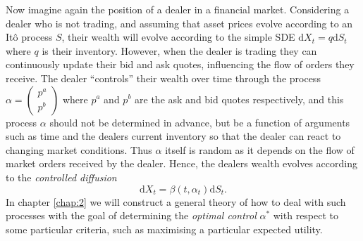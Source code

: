 Now imagine again the position of a dealer in a financial market. Considering a dealer
who is not trading, and assuming that asset prices evolve
according to an It\^{o} process $S$, their wealth will evolve according to the simple 
SDE $\mathrm dX_t=q\mathrm dS_t$ where $q$ is their inventory. However, when the dealer
is trading they can 
continuously update their bid and ask quotes, influencing the flow of orders 
they receive. The dealer ``controls'' their wealth over time through the process $\alpha=\begin{pmatrix}p^a\\p^b\end{pmatrix}$
where $p^a$ and $p^b$ are the ask and bid quotes respectively, and this process 
$\alpha$ should not be determined in advance, but be a function of arguments such 
as time and the dealers current inventory so that the dealer can react to changing 
market conditions. Thus $\alpha$ itself is random as it depends on the 
flow of market orders received by the dealer.
Hence, the dealers wealth evolves according to the \emph{controlled diffusion}
\begin{equation*}
    \mathrm dX_t=\beta(t,\alpha_t)\mathrm dS_t.
\end{equation*}
In chapter \ref{chap:2} we will construct a general theory of how to deal with 
such processes with the goal of determining the \emph{optimal control} $\alpha^*$ with 
respect to some particular criteria, such as maximising a particular expected utility.
